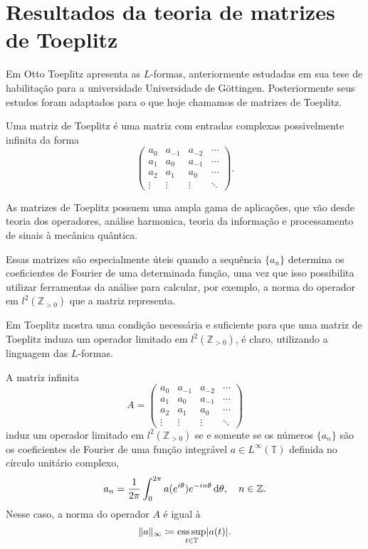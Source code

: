 \section{Resultados da teoria de matrizes de Toeplitz} \vspace{1cm}

\par Em \cite{Toeplitz1911} Otto Toeplitz apresenta as $L$-formas, anteriormente estudadas em sua tese de habilitação para a universidade Universidade de Göttingen. Posteriormente seus estudos foram adaptados para o que hoje chamamos de matrizes de Toeplitz.

Uma matriz de Toeplitz é uma matriz com entradas complexas possivelmente infinita da forma \[ \begin{pmatrix} a_{0} & a_{-1} & a_{-2} & \cdots \\ a_{1} & a_{0} & a_{-1} & \cdots \\ a_2 & a_{1} & a_{0} & \cdots \\ \vdots & \vdots & \vdots & \ddots \end{pmatrix}\text{.} \]

As matrizes de Toeplitz possuem uma ampla gama de aplicações, que vão desde teoria dos operadores, análise harmonica, teoria da informação e processamento de sinais à mecânica quântica.

Essas matrizes são especialmente úteis quando a sequência $\{a_n\}$ determina os coeficientes de Fourier de uma determinada função, uma vez que isso possibilita utilizar ferramentas da análise para calcular, por exemplo, a norma do operador em $l^2(\mathbb{Z}_{> 0})$ que a matriz representa.

Em \cite{Toeplitz1911} Toeplitz mostra uma condição necessária e suficiente para que uma matriz de Toeplitz induza um operador limitado em $l^2(\mathbb{Z}_{> 0})$, é claro, utilizando a linguagem das $L$-formas.

\begin{theorem*}
  A matriz infinita \[A = \begin{pmatrix} a_{0} & a_{-1} & a_{-2} & \cdots \\ a_{1} & a_{0} & a_{-1} & \cdots \\ a_2 & a_{1} & a_{0} & \cdots \\ \vdots & \vdots & \vdots & \ddots \end{pmatrix}\] induz um operador limitado em $l^2(\mathbb{Z}_{>0})$ se e somente se os números $\{a_n\}$ são os coeficientes de Fourier de uma função integrável $a \in L^\infty(\mathbb{T})$ definida no círculo unitário complexo, \[a_n = \frac{1}{2\pi} \int_{0}^{2\pi} a(e^{i \theta})e^{-i n \theta} \operatorname{d}\!{\theta}, \quad n \in \mathbb{Z}\text{.}\]
  Nesse caso, a norma do operador $A$ é igual à \[\|a\|_{\infty} \coloneqq \operatorname*{ess\,sup}_{t \in \mathbb{T}}\lvert a(t)\rvert\text{.}\]
\end{theorem*}

